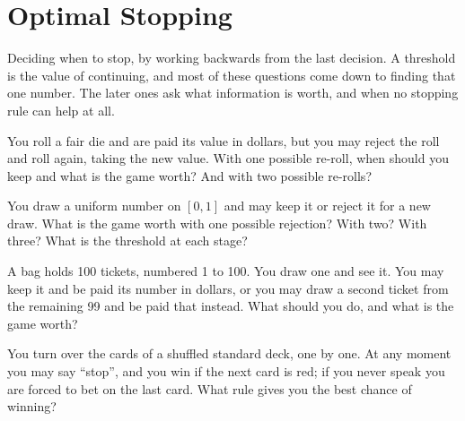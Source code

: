 \chapter{Optimal Stopping}\label{ch:iv1:optimal-stopping}

\begin{ivtrains}
Deciding when to stop, by working backwards from the last decision. A threshold is the value of continuing, and most of these questions come down to finding that one number. The later ones ask what information is worth, and when no stopping rule can help at all.
\end{ivtrains}

\begin{question}\label{iq:iv1:optimal-stopping:1}
You roll a fair die and are paid its value in dollars, but you may reject the roll and roll again, taking the new value. With one possible re-roll, when should you keep and what is the game worth? And with two possible re-rolls?
\end{question}

\begin{question}\label{iq:iv1:optimal-stopping:2}
You draw a uniform number on $[0, 1]$ and may keep it or reject it for a new draw. What is the game worth with one possible rejection? With two? With three? What is the threshold at each stage?
\end{question}

\begin{question}\label{iq:iv1:optimal-stopping:3}
A bag holds 100 tickets, numbered 1 to 100. You draw one and see it. You may keep it and be paid its number in dollars, or you may draw a second ticket from the remaining 99 and be paid that instead. What should you do, and what is the game worth?
\end{question}

\begin{question}\label{iq:iv1:optimal-stopping:4}
You turn over the cards of a shuffled standard deck, one by one. At any moment you may say ``stop'', and you win if the next card is red; if you never speak you are forced to bet on the last card. What rule gives you the best chance of winning?
\end{question}

